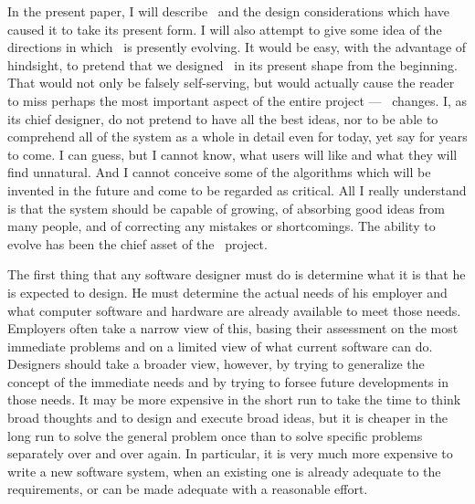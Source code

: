      In the present paper, I will describe \AIPS\ and the design
considerations which have caused it to take its present form.  I will
also attempt to give some idea of the directions in which \AIPS\ is
presently evolving.  It would be easy, with the advantage of hindsight,
to pretend that we designed \AIPS\ in its present shape from the
beginning.  That would not only be falsely self-serving, but would
actually cause the reader to miss perhaps the most important aspect
of the entire project --- \AIPS\ changes.  I, as its chief designer, do
not pretend to have all the best ideas, nor to be able to comprehend
all of the system as a whole in detail even for today, yet say for
years to come.  I can guess, but I cannot know, what users will like
and what they will find unnatural.  And I cannot conceive some of the
algorithms which will be invented in the future and come to be regarded
as critical.  All I really understand is that the system should
be capable of growing, of absorbing good ideas from many people,
and of correcting any mistakes or shortcomings.  The ability to evolve
has been the chief asset of the \AIPS\ project.

\vfill\eject%

     The first thing that any software designer must do is determine what
it is that he is expected to design.  He must determine the actual needs
of his employer and what computer software and hardware are already
available to meet those needs.  Employers often take a narrow view of
this, basing their assessment on the most immediate problems and on a
limited view of what current software can do.  Designers should
take a broader view, however, by trying to generalize the concept of
the immediate needs and by trying to forsee future developments in
those needs.  It may be more expensive in the short run to take the
time to think broad thoughts and to design and execute broad ideas,
but it is cheaper in the long run to solve the general problem once
than to solve specific problems separately over and over again.  In
particular, it is very much more expensive to write a new software
system, when an existing one is already adequate to the requirements,
or can be made adequate with a reasonable effort.


